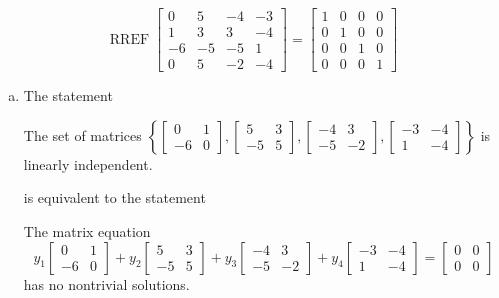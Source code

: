 \begin{exerciseAnswer} 


\[\operatorname{RREF} \left[\begin{array}{cccc}
0 & 5 & -4 & -3 \\
1 & 3 & 3 & -4 \\
-6 & -5 & -5 & 1 \\
0 & 5 & -2 & -4
\end{array}\right] = \left[\begin{array}{cccc}
1 & 0 & 0 & 0 \\
0 & 1 & 0 & 0 \\
0 & 0 & 1 & 0 \\
0 & 0 & 0 & 1
\end{array}\right] \]


\begin{enumerate}[(a)]
\item The statement 
\begin{center}\begin{minipage}{0.8\textwidth}
 The set of matrices \( \left\{ \left[\begin{array}{cc}
0 & 1 \\
-6 & 0
\end{array}\right] , \left[\begin{array}{cc}
5 & 3 \\
-5 & 5
\end{array}\right] , \left[\begin{array}{cc}
-4 & 3 \\
-5 & -2
\end{array}\right] , \left[\begin{array}{cc}
-3 & -4 \\
1 & -4
\end{array}\right] \right\} \) is linearly independent.
\end{minipage}\end{center}
     is equivalent to the statement 
\begin{center}\begin{minipage}{0.8\textwidth}
 The matrix equation \[ y_{1} \left[\begin{array}{cc}
0 & 1 \\
-6 & 0
\end{array}\right] + y_{2} \left[\begin{array}{cc}
5 & 3 \\
-5 & 5
\end{array}\right] + y_{3} \left[\begin{array}{cc}
-4 & 3 \\
-5 & -2
\end{array}\right] + y_{4} \left[\begin{array}{cc}
-3 & -4 \\
1 & -4
\end{array}\right] = \left[\begin{array}{cc}
0 & 0 \\
0 & 0
\end{array}\right] \] has no nontrivial solutions. 
\end{minipage}\end{center}
    

\end{enumerate}
\end{exerciseAnswer}
